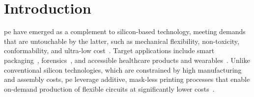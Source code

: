 \section{Introduction}
\label{sec:introduction}
\gls{pe} have emerged as a complement to silicon-based technology, meeting demands that are untouchable by the latter, such as mechanical flexibility, non-toxicity, conformability, and ultra-low cost~\cite{Bleier:ISCA:2020:printedml}. 
Target applications include smart packaging~\cite{smartpackaging2022, disposable:JSNB:2023}, forensics~\cite{salivary:Talanta:2020}, and accessible healthcare products and wearables~\cite{bodytemperature:sna:2020,pressuresensor:research:2022,wearable:adma:2022,Wearable:acssensors:2019,healthcare:Nanoscale:2024}.
Unlike conventional silicon technologies, which are constrained by high manufacturing and assembly costs, \gls{pe} leverage additive, mask-less printing processes that enable on-demand production of flexible circuits at significantly lower costs~\cite{cui2016printed}.


